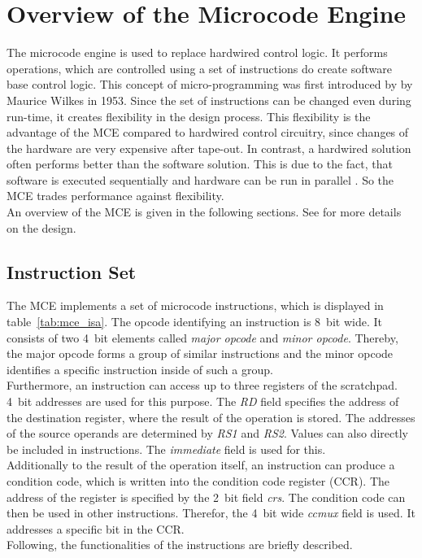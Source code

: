 \section{Overview of the Microcode Engine}

The microcode engine is used to replace hardwired control logic.
It performs operations, which are controlled using a set of instructions do create software base control logic.
This concept of micro-programming was first introduced by by Maurice Wilkes \cite{genesis} in 1953.
Since the set of instructions can be changed even during run-time, it creates flexibility in the design process.
This flexibility is the advantage of the MCE compared to hardwired control circuitry, since changes of the hardware are very expensive after tape-out.
In contrast, a hardwired solution often performs better than the software solution.
This is due to the fact, that software is executed sequentially and hardware can be run in parallel \cite{verilog}.
So the MCE trades performance against flexibility.\\
An overview of the MCE is given in the following sections. See \cite{mce} for more details on the design.

\subsection{Instruction Set}

The MCE implements a set of microcode instructions, which is displayed in table~\ref{tab:mce_isa}.
The opcode identifying an instruction is 8~bit wide.
It consists of two 4~bit elements called \emph{major opcode} and \emph{minor opcode}.
Thereby, the major opcode forms a group of similar instructions and the minor opcode identifies a specific instruction inside of such a group.\\
Furthermore, an instruction can access up to three registers of the scratchpad.
4~bit addresses are used for this purpose.
The \emph{RD} field specifies the address of the destination register, where the result of the operation is stored.
The addresses of the source operands are determined by \emph{RS1} and \emph{RS2}.
Values can also directly be included in instructions.
The \emph{immediate} field is used for this.\\
Additionally to the result of the operation itself, an instruction can produce a condition code, which is written into the condition code register (CCR).
The address of the register is specified by the 2~bit field \emph{crs}.
The condition code can then be used in other instructions.
Therefor, the 4~bit wide \emph{ccmux} field is used.
It addresses a specific bit in the CCR.\\
Following, the functionalities of the instructions are briefly described.\\


